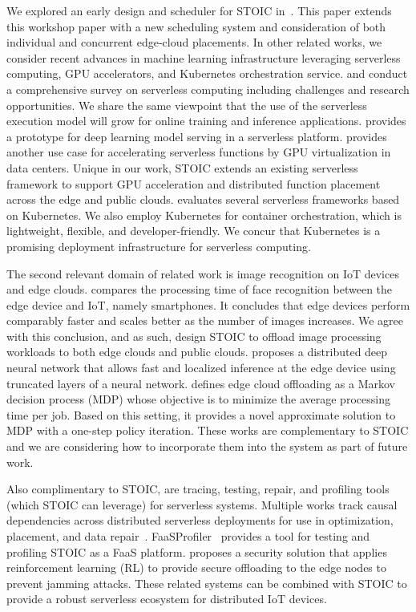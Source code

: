 We explored an early design and scheduler for STOIC in~\cite{ref:stoic}.  This
paper extends this workshop paper with a new scheduling system and
consideration of both individual and concurrent edge-cloud placements. In
other related works, we consider recent advances in machine learning
infrastructure leveraging serverless computing, GPU accelerators, and
Kubernetes orchestration service. \cite{ref:serverlessstep} and
\cite{ref:berkeleyserverless} conduct a comprehensive survey on serverless
computing including challenges and research opportunities. We share the same
viewpoint that the use of the serverless execution model will grow for online
training and inference applications. \cite{ref:deepserving} provides a
prototype for deep learning model serving in a serverless platform.
\cite{ref:accelerated} provides another use case for accelerating serverless
functions by GPU virtualization in data centers. Unique in our work, STOIC
extends an existing serverless framework to support GPU acceleration and
distributed function placement across the edge and public clouds.
\cite{ref:evaluation} evaluates several serverless frameworks based on
Kubernetes. We also employ Kubernetes for container orchestration, which is
lightweight, flexible, and developer-friendly.  We concur that Kubernetes is a
promising deployment infrastructure for serverless computing.  

The second relevant domain of related work is image recognition on IoT devices
and edge clouds. \cite{ref:face} compares the processing time of face
recognition between the edge device and IoT, namely smartphones. It concludes
that edge devices perform comparably faster and scales better as the number of
images increases. We agree with this conclusion, and as such, design STOIC to
offload image processing workloads to both edge clouds and public clouds.
\cite{ref:DDNN} proposes a distributed deep neural network that allows fast
and localized inference at the edge device using truncated layers of a neural
network. \cite{ref:cooperative} defines edge cloud offloading as a Markov
decision process (MDP) whose objective is to minimize the average processing
time per job. Based on this setting, it provides a novel approximate solution
to MDP with a one-step policy iteration. These works are complementary to
STOIC and we are considering how to incorporate them into the system as part
of future work.

Also complimentary to STOIC, are tracing, testing, repair, and profiling tools
(which STOIC can leverage) for serverless systems. Multiple works track causal
dependencies across distributed serverless deployments for use in
optimization, placement, and data
repair~\cite{ref:repairdata,deptracing19,gammaray17,aws-xray}.
FaaSProfiler~\cite{ref:profile} provides a tool for testing and profiling
STOIC as a FaaS platform. \cite{ref:security} proposes a security solution
that applies reinforcement learning (RL) to provide secure offloading to the
edge nodes to prevent jamming attacks. These related systems can be combined
with STOIC to provide a robust serverless ecosystem for distributed IoT
devices.

